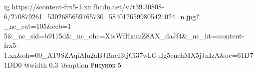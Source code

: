  
 
 
 
 

\ifcmt
  ig https://scontent-frx5-1.xx.fbcdn.net/v/t39.30808-6/270879261_5302685659765730_5840126599805421024_n.jpg?_nc_cat=105&ccb=1-5&_nc_sid=b9115d&_nc_ohc=XtsWfHxunZ8AX_daJf4&_nc_ht=scontent-frx5-1.xx&oh=00_AT9SZAqiAlu2aBJBneI3tjCi37wkGuIg5cnchMX5jJnIzA&oe=61D71DD0
  @width 0.3
	@caption Рисунок 5
\fi
